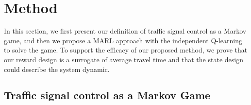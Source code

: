 \section{Method}

In this section, we first present our definition of traffic signal control as a Markov game, and then we propose a MARL approach with the independent Q-learning to solve the game. To support the efficacy of our proposed method, we prove that our reward design is a surrogate of average travel time and that the state design could describe the system dynamic.

\subsection{Traffic signal control as a Markov Game}


